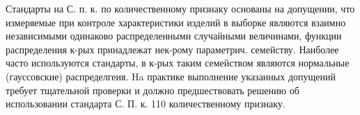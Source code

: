 \documentclass[10pt]{article}
\begin{document}
Стандарты на С. п. к. по количественному признаку основаны на допущении, что измеряемые при контроле характеристики изделий в выборке являются взаимно независимыми одинаково распределенными случайными величинами, функции распределения к-рых принадлежат нек-рому параметрич. семейству. Наиболее часто используются стандарты, в к-рых таким семейством являются нормальные (гауссовские) распределгеия. Ha практике выполнение указанных допущений требует тщательной проверки и должно предшествовать решению об использовании стандарта С. П. к. 110 количественному признаку.
\end{document}
